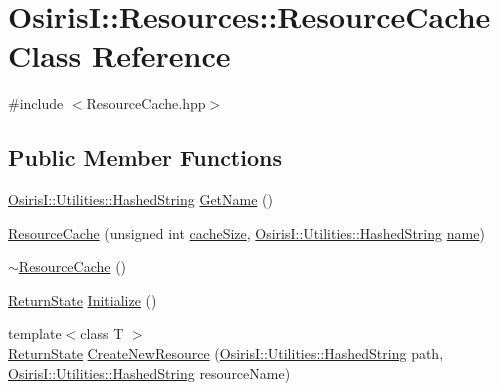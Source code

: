 \hypertarget{class_osiris_i_1_1_resources_1_1_resource_cache}{\section{Osiris\-I\-:\-:Resources\-:\-:Resource\-Cache Class Reference}
\label{class_osiris_i_1_1_resources_1_1_resource_cache}
}


{\ttfamily \#include $<$Resource\-Cache.\-hpp$>$}

\subsection*{Public Member Functions}
\begin{DoxyCompactItemize}
\item 
\hyperlink{class_osiris_i_1_1_utilities_1_1_hashed_string}{Osiris\-I\-::\-Utilities\-::\-Hashed\-String} \hyperlink{class_osiris_i_1_1_resources_1_1_resource_cache_af7910149c7cf4f7027f5b77e07b54e68}{Get\-Name} ()
\item 
\hyperlink{class_osiris_i_1_1_resources_1_1_resource_cache_aec884467436cbe26a7fd398ee890d357}{Resource\-Cache} (unsigned int \hyperlink{class_osiris_i_1_1_resources_1_1_resource_cache_a678b8c34db6f09a51d4659cfe4fa61ac}{cache\-Size}, \hyperlink{class_osiris_i_1_1_utilities_1_1_hashed_string}{Osiris\-I\-::\-Utilities\-::\-Hashed\-String} \hyperlink{class_osiris_i_1_1_resources_1_1_resource_cache_a80a0b02592d00bf92b856ee7a9c723a1}{name})
\item 
\hyperlink{class_osiris_i_1_1_resources_1_1_resource_cache_aabc4c240f12d40f8c24a11126abb55e6}{$\sim$\-Resource\-Cache} ()
\item 
\hyperlink{namespace_osiris_i_a8f53bf938dc75c65c6a529694514013e}{Return\-State} \hyperlink{class_osiris_i_1_1_resources_1_1_resource_cache_a89e021d7a31e9bb5327fc4e0034848ff}{Initialize} ()
\item 
{\footnotesize template$<$class T $>$ }\\\hyperlink{namespace_osiris_i_a8f53bf938dc75c65c6a529694514013e}{Return\-State} \hyperlink{class_osiris_i_1_1_resources_1_1_resource_cache_a40b117a627f6e6d7659aeb64b037c158}{Create\-New\-Resource} (\hyperlink{class_osiris_i_1_1_utilities_1_1_hashed_string}{Osiris\-I\-::\-Utilities\-::\-Hashed\-String} path, \hyperlink{class_osiris_i_1_1_utilities_1_1_hashed_string}{Osiris\-I\-::\-Utilities\-::\-Hashed\-String} resource\-Name)
\item 

\end{DoxyCompactItemize}
